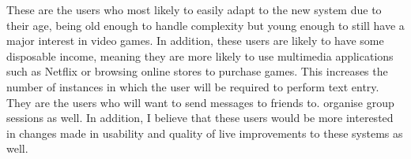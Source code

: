 \documentclass[requirements.tex]{subfiles}
\begin{document}
These are the users who most likely to easily adapt to the new system due to
their age, being old enough to handle complexity but young enough to still have
a major interest in video games. In addition, these users are likely to have
some disposable income, meaning they are more likely to use multimedia
applications such as Netflix or browsing online stores to purchase games. This
increases the number of instances in which the user will be required to perform
text entry. They are the users who will want to send messages to friends to.
organise group sessions as well. In addition, I believe that these users would
be more interested in changes made in usability and quality of live improvements
to these systems as well.


\newpage
\end{document}

